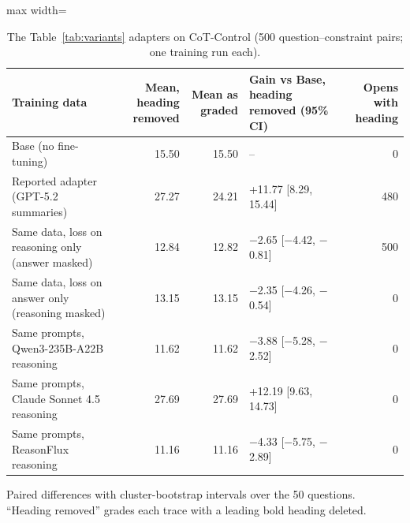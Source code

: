\begin{table}[t]
\centering\small
\caption{The Table~\ref{tab:variants} adapters on CoT-Control (500 question--constraint pairs; one training run each).}\label{tab:variants-cot}
\setlength{\tabcolsep}{4pt}
\begin{adjustbox}{max width=\linewidth}
\begin{tabular}{lrrlr}
\toprule
Training data & Mean, heading removed & Mean as graded & Gain vs Base, heading removed (95\% CI) & Opens with heading \\
\midrule
Base (no fine-tuning) & 15.50 & 15.50 & -- & 0 \\
Reported adapter (GPT-5.2 summaries) & 27.27 & 24.21 & +11.77 [8.29, 15.44] & 480 \\
Same data, loss on reasoning only (answer masked) & 12.84 & 12.82 & $-$2.65 [$-$4.42, $-$0.81] & 500 \\
Same data, loss on answer only (reasoning masked) & 13.15 & 13.15 & $-$2.35 [$-$4.26, $-$0.54] & 0 \\
Same prompts, Qwen3-235B-A22B reasoning & 11.62 & 11.62 & $-$3.88 [$-$5.28, $-$2.52] & 0 \\
Same prompts, Claude Sonnet 4.5 reasoning & 27.69 & 27.69 & +12.19 [9.63, 14.73] & 0 \\
Same prompts, ReasonFlux reasoning & 11.16 & 11.16 & $-$4.33 [$-$5.75, $-$2.89] & 0 \\
\bottomrule
\end{tabular}
\end{adjustbox}
\par\smallskip\begin{minipage}{0.97\linewidth}\footnotesize Paired differences with cluster-bootstrap intervals over the 50 questions. ``Heading removed'' grades each trace with a leading bold heading deleted.\end{minipage}
\end{table}
